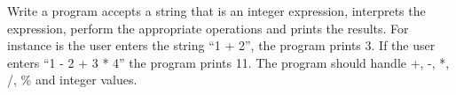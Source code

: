 Write a program accepts a string that is an integer expression, interprets the expression, perform the appropriate operations and prints the results. For instance is the user enters the string ``1 + 2'', the program prints 3. If the user enters ``1 - 2 + 3 * 4'' the program prints 11. The program should handle +, -, *, /, \% and integer values.

